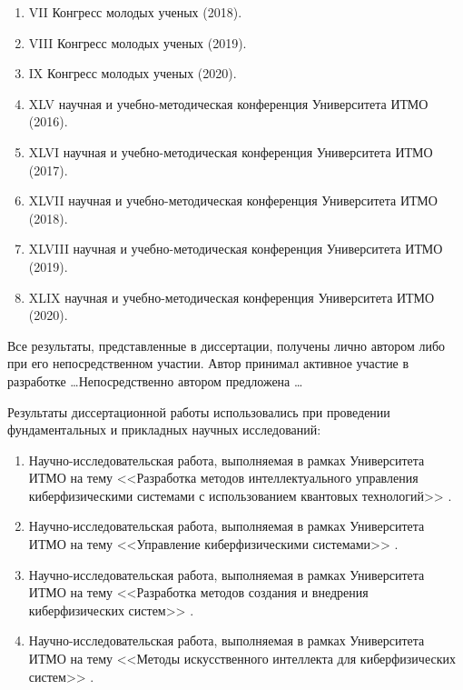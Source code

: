 \begin{enumerate}[beginpenalty=10000]
	\item VII Конгресс молодых ученых (2018).
	\item VIII Конгресс молодых ученых (2019).
	\item IX Конгресс молодых ученых (2020).
	\item XLV научная и учебно-методическая конференция Университета \mbox{ИТМО} (2016).
	\item XLVI научная и учебно-методическая конференция Университета \mbox{ИТМО} (2017).
	\item XLVII научная и учебно-методическая конференция Университета \mbox{ИТМО} (2018).
	\item XLVIII научная и учебно-методическая конференция Университета \mbox{ИТМО} (2019).
	\item XLIX научная и учебно-методическая конференция Университета \mbox{ИТМО} (2020).
\end{enumerate}

{\contribution} Все результаты, представленные в диссертации, получены лично автором либо при его непосредственном участии. Автор принимал активное участие в разработке \dots Непосредственно автором предложена \dots

{\implementation} Результаты диссертационной работы использовались при проведении фундаментальных и прикладных научных исследований:

\begin{enumerate}[beginpenalty=10000]
	\item Научно-исследовательская работа, выполняемая в рамках Университета ИТМО на тему <<Разработка методов интеллектуального управления киберфизическими системами с использованием квантовых технологий>>  .
	\item Научно-исследовательская работа, выполняемая в рамках Университета ИТМО на тему <<Управление киберфизическими системами>>  .
	\item Научно-исследовательская работа, выполняемая в рамках Университета ИТМО на тему <<Разработка методов создания и внедрения киберфизических систем>>  .
	\item Научно-исследовательская работа, выполняемая в рамках Университета ИТМО на тему <<Методы искусственного интеллекта для киберфизических систем>>  .
\end{enumerate}


